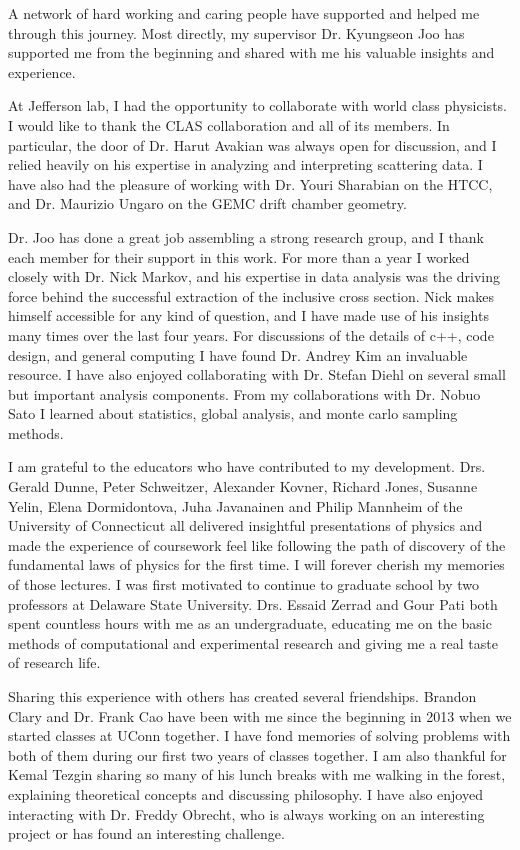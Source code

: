 A network of hard working and caring people have supported and helped me through this journey.  Most directly, my supervisor Dr. Kyungseon Joo has supported me from the beginning and shared with me his valuable insights and experience.

At Jefferson lab, I had the opportunity to collaborate with world class physicists.  I would like to thank the CLAS collaboration and all of its members.  In particular, the door of Dr. Harut Avakian was always open for discussion, and I relied heavily on his expertise in analyzing and interpreting scattering data.  I have also had the pleasure of working with Dr. Youri Sharabian on the HTCC, and Dr. Maurizio Ungaro on the GEMC drift chamber geometry.  

Dr. Joo has done a great job assembling a strong research group, and I thank each member for their support in this work.  For more than a year I worked closely with Dr. Nick Markov, and his expertise in data analysis was the driving force behind the successful extraction of the inclusive cross section.  Nick makes himself accessible for any kind of question, and I have made use of his insights many times over the last four years.  For discussions of the details of c++, code design, and general computing I have found Dr. Andrey Kim an invaluable resource.  I have also enjoyed collaborating with Dr. Stefan Diehl on several small but important analysis components.  From my collaborations with Dr. Nobuo Sato I learned about statistics, global analysis, and monte carlo sampling methods.

I am grateful to the educators who have contributed to my development.  Drs. Gerald Dunne, Peter Schweitzer, Alexander Kovner, Richard Jones, Susanne Yelin, Elena Dormidontova, Juha Javanainen and Philip Mannheim of the University of Connecticut all delivered insightful presentations of physics and made the experience of coursework feel like following the path of discovery of the fundamental laws of physics for the first time.  I will forever cherish my memories of those lectures.  I was first motivated to continue to graduate school by two professors at Delaware State University.  Drs. Essaid Zerrad and Gour Pati both spent countless hours with me as an undergraduate, educating me on the basic methods of computational and experimental research and giving me a real taste of research life.  

Sharing this experience with others has created several friendships.  Brandon Clary and Dr. Frank Cao have been with me since the beginning in 2013 when we started classes at UConn together.  I have fond memories of solving problems with both of them during our first two years of classes together.  I am also thankful for Kemal Tezgin sharing so many of his lunch breaks with me walking in the forest, explaining theoretical concepts and discussing philosophy.  I have also enjoyed interacting with Dr. Freddy Obrecht, who is always working on an interesting project or has found an interesting challenge.

